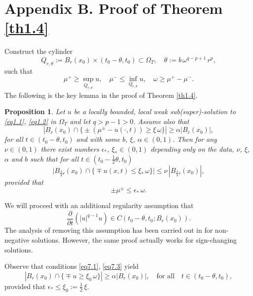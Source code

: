 \documentclass[a4paper,11pt,fullpage]{article}
\numberwithin{equation}{section}
\newtheorem{propo}{Proposition}[section]
\begin{document}
\section{Appendix B. Proof of Theorem \ref{th1.4}}
 Construct the cylinder
$$Q_{r, \theta}:=B_r(x_0)\times (t_0-\theta, t_0)\subset \Omega_T, \quad \theta:=b\,\omega^{q-p+1}\,r^p,$$ such that
$$\mu^+\geqslant \sup\limits_{Q_{r, \theta}}u,\quad \mu^-\leqslant \inf\limits_{Q_{r, \theta}} u,
\quad \omega\geqslant \mu^+-\mu^-.$$
The following is the key lemma in the proof of Theorem \ref{th1.4}. 
\begin{propo}\label{pr7.1}
 Let $u$ be a locally bounded, local weak sub(super)-solution to \eqref{eq1.1}, \eqref{eq1.2}
 in $\Omega_T$ and let $q>p-1>0$. Assume also that
\begin{equation}\label{eq7.1}
|B_r(x_0)\cap\big\{\pm (\mu^{\pm}-u(\cdot, t))\geqslant \xi\,\omega\big\}|\geqslant \alpha|B_r(x_0)|,
\end{equation}
 for all $t\in (t_0-\theta, t_0)$  and with some $b$, $\xi$, $\alpha \in (0, 1)$. Then for any $\nu\in (0, 1)$ 
 there exist numbers   $\epsilon_*$, $\xi_*\in (0, 1)$ depending only on the data, $\nu$, $\xi$, $\alpha$ and $b$ such that
 for all  $t\in (t_0-\frac{1}{2}\theta, t_0)$
\begin{equation}\label{eq7.2}
\big|B_{\frac{3}{4}r}(x_0)\cap\big\{\mp u(x, t)\leqslant \xi_*\,\omega\big\}\big|\leqslant \nu\,|B_{\frac{3}{4}r}(x_0)|,
\end{equation}
provided that 
\begin{equation}\label{eq7.3}
\pm \mu^{\pm}\leqslant \epsilon_*\,\omega.
\end{equation}
\end{propo}
We will  proceed  with  an  additional  regularity  assumption  that
\begin{equation}\label{eq7.4}
\frac{\partial}{\partial t}(|u|^{q-1} u) \in C(t_0-\theta, t_0; B_r(x_0)).
\end{equation}
The analysis of removing this assumption has been carried out in \cite[Section 6]{Bog3} for non-negative solutions. However, the
 same proof actually works for sign-changing solutions.
 

Observe that conditions \eqref{eq7.1}, \eqref{eq7.3} yield
\begin{equation}\label{eq7.5}
|B_r(x_0)\cap\big\{\mp u\geqslant \xi_0\,\omega\big\}|\geqslant \alpha|B_r(x_0)|,\quad \text{for all}\quad t\in(t_0-\theta, t_0),
\end{equation}
provided that $\epsilon_*\leqslant \xi_0:=\frac{1}{2}\,\xi.$
\end{document}
